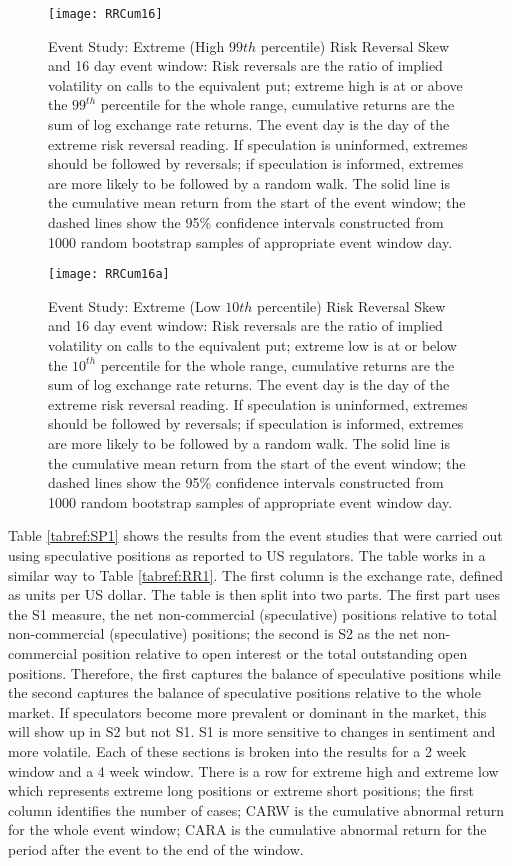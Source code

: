 \documentclass[ijfs,article,submit,oneauthor,pdftex,10pt,a4paper]{mdpi}
\begin{document}
\begin{figure}
\graphicspath{{../Figures/}}
\centering
\texttt{[image: RRCum16]}
\caption{Event Study: Extreme (High $99{th}$ percentile) Risk Reversal Skew and 16 day event window: Risk reversals are the ratio of implied volatility on calls to the equivalent put; extreme high is at or above the $99^{th}$ percentile for the whole range, cumulative returns are the sum of log exchange rate returns. The event day is the day of the extreme risk reversal reading.  If speculation is uninformed, extremes should be followed by reversals; if speculation is informed, extremes are more likely to be followed by a random walk. The solid line is the cumulative mean return from the start of the event window; the dashed lines show the 95\% confidence intervals constructed from 1000 random bootstrap samples of appropriate event window day.}
\label{fig:ES5}
\end{figure}

\begin{figure}
\graphicspath{{../Figures/}}
\centering
\texttt{[image: RRCum16a]}
\caption{Event Study: Extreme (Low $10{th}$ percentile) Risk Reversal Skew and 16 day event window: Risk reversals are the ratio of implied volatility on calls to the equivalent put; extreme low is at or below the $10^{th}$ percentile for the whole range, cumulative returns are the sum of log exchange rate returns. The event day is the day of the extreme risk reversal reading.  If speculation is uninformed, extremes should be followed by reversals; if speculation is informed, extremes are more likely to be followed by a random walk. The solid line is the cumulative mean return from the start of the event window; the dashed lines show the 95\% confidence intervals constructed from 1000 random bootstrap samples of appropriate event window day.}
\label{fig:ES2}
\end{figure}

Table \ref{tabref:SP1} shows the results from the event studies that were carried out using speculative positions as reported to US regulators.  The table works in a similar way to Table \ref{tabref:RR1}.  The first column is the exchange rate, defined as units per US dollar.  The table is then split into two parts.  The first part uses the S1 measure, the net non-commercial (speculative) positions relative to total non-commercial (speculative) positions; the second is S2 as the net non-commercial position relative to open interest or the total outstanding open positions.  Therefore, the first captures the balance of speculative positions while the second captures the balance of speculative positions relative to the whole market.  If speculators become more prevalent or dominant in the market, this will show up in S2 but not S1.  S1 is more sensitive to changes in sentiment and more volatile. Each of these sections is broken into the results for a 2 week window and a 4 week window.  There is a row for extreme high and extreme low which represents extreme long positions or extreme short positions; the first  column identifies the number of cases; CARW is the cumulative abnormal return for the whole event window; CARA is the cumulative abnormal return for the period after the event to the end of the window.     
\end{document}
